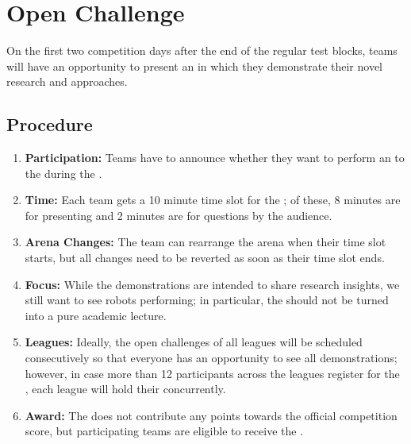 \section{Open Challenge}
\label{sec:rules:openchallenge}

On the first two competition days after the end of the regular test blocks, teams will have an opportunity to present an \OpenChallenge{} in which they demonstrate their novel research and approaches.

\subsection{Procedure}
\label{sec:rules:ocprocedure}
\begin{enumerate}
	\item \textbf{Participation:} Teams have to announce whether they want to perform an \OpenChallenge{} to the  during the \SetupDays{}.
	\item \textbf{Time:} Each team gets a 10 minute time slot for the \OpenChallenge; of these, 8 minutes are for presenting and 2 minutes are for questions by the audience.
	\item \textbf{Arena Changes:} The team can rearrange the arena when their time slot starts, but all changes need to be reverted as soon as their time slot ends.
	\item \textbf{Focus:} While the demonstrations are intended to share research insights, we still want to see robots performing; in particular, the \OpenChallenge{} should not be turned into a pure academic lecture.
	\item \textbf{Leagues:} Ideally, the open challenges of all \AtHome{} leagues will be scheduled consecutively so that everyone has an opportunity to see all demonstrations; however, in case more than 12 participants across the leagues register for the \OpenChallenge, each league will hold their \OpenChallenge{} concurrently.
	\item \textbf{Award:} The \OpenChallenge{} does not contribute any points towards the official competition score, but participating teams are eligible to receive the \OCAward{}.
\end{enumerate}
